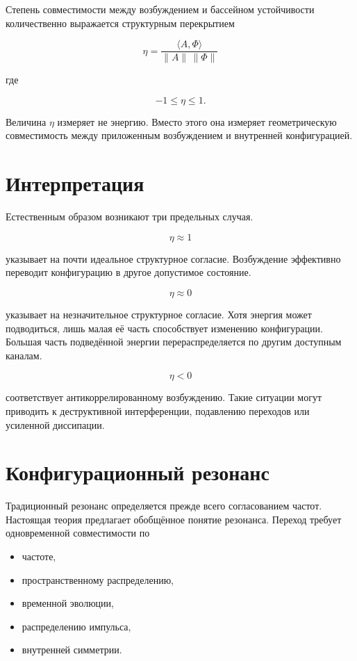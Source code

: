 Степень совместимости между возбуждением и бассейном устойчивости количественно выражается структурным перекрытием

\[ \boxed{ \eta = \frac {\langle A,\Phi\rangle} {\|A\|\,\|\Phi\|} } \]

где

\[ -1 \le \eta \le 1. \]

Величина $\eta$ измеряет не энергию. Вместо этого она измеряет геометрическую совместимость между приложенным возбуждением и внутренней конфигурацией.

\section{Интерпретация}

Естественным образом возникают три предельных случая.

\[ \eta\approx1 \]

указывает на почти идеальное структурное согласие. Возбуждение эффективно переводит конфигурацию в другое допустимое состояние.

\bigskip

\[ \eta\approx0 \]

указывает на незначительное структурное согласие. Хотя энергия может подводиться, лишь малая её часть способствует изменению конфигурации. Большая часть подведённой энергии перераспределяется по другим доступным каналам.

\bigskip

\[ \eta<0 \]

соответствует антикоррелированному возбуждению. Такие ситуации могут приводить к деструктивной интерференции, подавлению переходов или усиленной диссипации.

\section{Конфигурационный резонанс}

Традиционный резонанс определяется прежде всего согласованием частот. Настоящая теория предлагает обобщённое понятие резонанса. Переход требует одновременной совместимости по

\begin{itemize}

\item частоте,

\item пространственному распределению,

\item временной эволюции,

\item распределению импульса,

\item внутренней симметрии.

\end{itemize}

